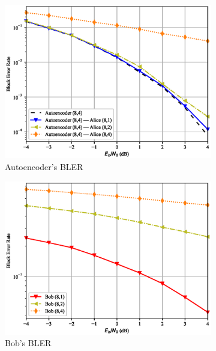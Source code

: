 \begin{figure}[th!]
	\begin{subfigure}{0.3\textwidth}
		\includegraphics[width=\linewidth]{figs/covert_autoencoder_bler_awgn}
		\caption{Autoencoder's BLER}
		\label{fig:awgn_resutls_ae}
	\end{subfigure}
	\hspace*{\fill}
	\begin{subfigure}{0.3\textwidth}
		\includegraphics[width=\linewidth]{figs/bob_bler_awgn}
		\caption{Bob's BLER}	
		\label{fig:awgn_resutls_bob}
	\end{subfigure}
	\hspace*{\fill}
	\begin{subfigure}{0.3\textwidth}

\end{subfigure}
\end{figure}
